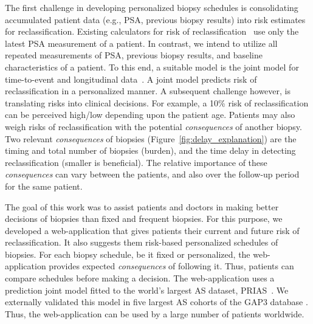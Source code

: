 The first challenge in developing personalized biopsy schedules is consolidating accumulated patient data (e.g., PSA, previous biopsy results) into risk estimates for reclassification. Existing calculators for risk of reclassification~\citep{partin1993use,makarov2007updated} use only the latest PSA measurement of a patient. In contrast, we intend to utilize all repeated measurements of PSA, previous biopsy results, and baseline characteristics of a patient. To this end, a suitable model is the joint model for time-to-event and longitudinal data~\citep{tomer2019, coley2017prediction,rizopoulos2012joint}. A joint model predicts risk of reclassification in a personalized manner. A subsequent challenge however, is translating risks into clinical decisions. For example, a 10\% risk of reclassification can be perceived high/low depending upon the patient age. Patients may also weigh risks of reclassification with the potential \textit{consequences} of another biopsy. Two relevant \textit{consequences} of biopsies (Figure~\ref{fig:delay_explanation}) are the timing and total number of biopsies (burden), and the time delay in detecting reclassification (smaller is beneficial). The relative importance of these \textit{consequences} can vary between the patients, and also over the follow-up period for the same patient.

The goal of this work was to assist patients and doctors in making better decisions of biopsies than fixed and frequent biopsies. For this purpose, we developed a web-application that gives patients their current and future risk of reclassification. It also suggests them risk-based personalized schedules of biopsies. For each biopsy schedule, be it fixed or personalized, the web-application provides expected \textit{consequences} of following it. Thus, patients can compare schedules before making a decision. The web-application uses a prediction joint model fitted to the world's largest AS dataset, PRIAS~\citep{bul2013active}. We externally validated this model in five largest AS cohorts of the GAP3 database \citep{gap3_2018}. Thus, the web-application can be used by a large number of patients worldwide.